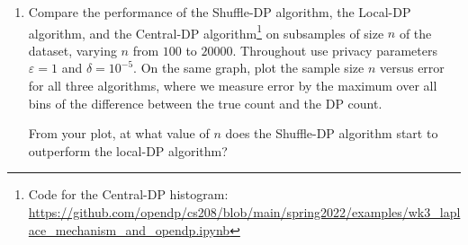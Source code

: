 \documentclass[11pt]{article}
\begin{document}
\begin{enumerate}[leftmargin=*]
\begin{enumerate}
\item Compare the performance of the Shuffle-DP algorithm, the Local-DP algorithm, and the Central-DP algorithm\footnote{Code for the Central-DP histogram: \url{https://github.com/opendp/cs208/blob/main/spring2022/examples/wk3_laplace_mechanism_and_opendp.ipynb}}
on subsamples of size $n$ of the dataset, varying $n$ from $100$ to $20000$.  Throughout use privacy parameters
 $\varepsilon=1$ and $\delta=10^{-5}$. 
On the same graph, plot the sample size $n$ versus error for all three algorithms, where we measure error by the maximum over all bins of the difference between the true count and the DP count.

From your plot, at what value of $n$ does the Shuffle-DP algorithm start to outperform the local-DP algorithm?
\end{enumerate}


\end{enumerate}
\end{document}
